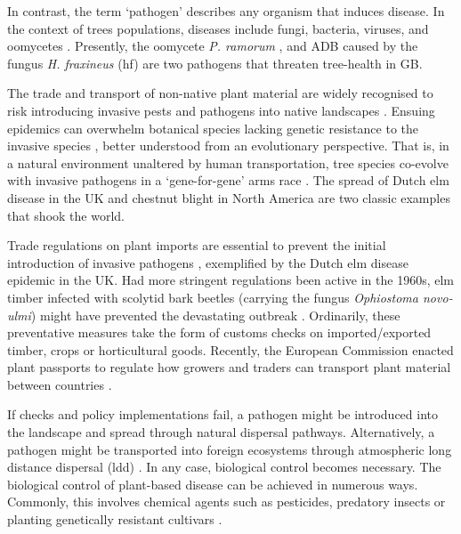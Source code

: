 In contrast, the term `pathogen' describes any organism that induces disease. 
In the context of trees populations, diseases include fungi, bacteria, viruses, and oomycetes \cite{balloux2017q, Boyd1235773}. 
Presently, the oomycete \textit{P. ramorum} \cite{brasier2005phytophthora}, and ADB
caused by the fungus \textit{H. fraxineus} (\acrshort{hf}) \cite{ash-dieback-costs, mitchell2014ash} are two pathogens
that threaten tree-health in GB.

The trade and transport of non-native plant material are widely recognised to risk introducing invasive pests and pathogens into native landscapes \cite{POTTER201761, lovett2016nonnative, roy2014increasing}.
Ensuing epidemics can overwhelm botanical species lacking genetic resistance to the invasive species \cite{desprez2016evolutionary}, better understood from an evolutionary perspective. That is, in a natural environment unaltered by human transportation, tree species co-evolve with invasive pathogens in a `gene-for-gene' arms race \cite{Thrall1735, dangl2001plant, flor1971current}.
The spread of Dutch elm disease in the UK \cite{doi:10.1111/j.1365-3059.2010.02391.x} and chestnut blight
in North America \cite{doi:10.1002/9780470535486.ch7} are two classic examples that shook the world.


Trade regulations on plant imports are essential to prevent the initial introduction of invasive pathogens \cite{rodoni2009role}, exemplified by the Dutch elm disease epidemic in the UK. 
Had more stringent regulations been active in the 1960s, elm timber infected with scolytid bark beetles (carrying the fungus \textit{Ophiostoma novo‐ulmi}) might have prevented the devastating outbreak \cite{doi:10.1111/j.1365-3059.2010.02391.x}. 
Ordinarily, these preventative measures take the form of customs checks on imported/exported timber, crops or horticultural goods. 
Recently, the European Commission enacted plant passports to regulate how growers and traders can transport plant material between countries \cite{wulfert2010implementation}.

If checks and policy implementations fail, a pathogen might be introduced into the landscape and spread through natural
dispersal pathways. Alternatively, a pathogen might be transported into foreign ecosystems through atmospheric 
long distance dispersal (\acrshort{ldd}) \cite{brown2002aerial}. In any case, biological control becomes necessary. 
The biological control of plant-based disease
can be achieved in numerous ways. Commonly, this involves chemical agents such as pesticides, predatory insects or planting
genetically resistant cultivars \cite{pal2006biological, baker1974biological}. 

